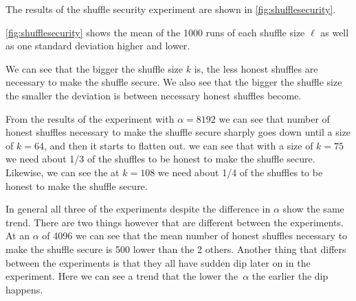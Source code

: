 The results of the shuffle security experiment are shown in \autoref{fig:shufflesecurity}.

\autoref{fig:shufflesecurity} shows the mean of the 1000 runs of each shuffle size $\ell$ as well as one standard deviation higher and lower.

We can see that the bigger the shuffle size $k$ is, the less honest shuffles are necessary to make the shuffle secure.
We also see that the bigger the shuffle size the smaller the deviation is between necessary honest shuffles become.

From the results of the experiment with $\alpha=8192$ we can see that number of honest shuffles necessary to make the shuffle secure sharply goes down until a size of $k=64$, and then it starts to flatten out.
we can see that with a size of $k=75$ we need about 1/3 of the shuffles to be honest to make the shuffle secure.
Likewise, we can see the at $k=108$ we need about 1/4 of the shuffles to be honest to make the shuffle secure.

In general all three of the experiments despite the difference in $\alpha$ show the same trend.
There are two things however that are different between the experiments.
At an $\alpha$ of 4096 we can see that the mean number of honest shuffles necessary to make the shuffle secure is 500 lower than the 2 others.
Another thing that differs between the experiments is that they all have sudden dip later on in the experiment.
Here we can see a trend that the lower the~$\alpha$ the earlier the dip happens.
